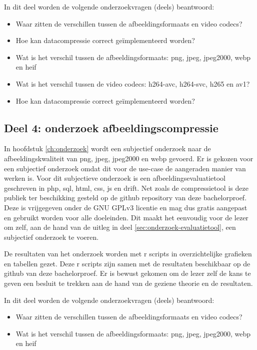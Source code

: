 In dit deel worden de volgende onderzoekvragen (deels) beantwoord: 
\begin{itemize}
	\item Waar zitten de verschillen tussen de \glspl{afbeeldingsformaat} en video \glspl{codec}?
	\item Hoe kan \gls{datacompressie} correct geïmplementeerd worden?
	\item Wat is het verschil tussen de \glspl{afbeeldingsformaat}: \gls{png}, \gls{jpeg}, \gls{jpeg2000}, \gls{webp} en \gls{heif}
	\item Wat is het verschil tussen de video \glspl{codec}: \gls{h264-avc}, \gls{h264-svc}, \gls{h265} en \gls{av1}?
	\item Hoe kan \gls{datacompressie} correct geïmplementeerd worden?
\end{itemize}

\subsection{Deel 4: onderzoek afbeeldingscompressie}
\label{sec:aanpak-bachelorproef-deel-4}

In hoofdstuk \ref{ch:onderzoek} wordt een subjectief onderzoek naar de afbeeldingskwaliteit van \gls{png}, \gls{jpeg}, \gls{jpeg2000} en \gls{webp} gevoerd. Er is gekozen voor een subjectief onderzoek omdat dit voor de \gls{use-case} de aangeraden manier van werken is. Voor dit subjectieve onderzoek is een \gls{afbeeldingsevaluatietool} geschreven in \gls{php}, \gls{sql}, \gls{html}, \gls{css}, \gls{js} en \gls{drift}. Net zoals de \gls{compressietool} is deze publiek ter beschikking gesteld op de \gls{github} repository van deze bachelorproef. Deze is vrijgegeven onder de GNU GPLv3 licentie en mag dus gratis aangepast en gebruikt worden voor alle doeleinden. Dit maakt het eenvoudig voor de lezer om zelf, aan de hand van de uitleg in deel \ref{sec:onderzoek-evaluatietool}, een subjectief onderzoek te voeren.

De resultaten van het onderzoek worden met \gls{r} scripts in overzichtelijke grafieken en tabellen gezet. Deze \gls{r} scripts zijn samen met de resultaten beschikbaar op de \gls{github} van deze bachelorproef. Er is bewust gekomen om de lezer zelf de kans te geven een besluit te trekken aan de hand van de geziene theorie en de resultaten.


In dit deel worden de volgende onderzoekvragen (deels) beantwoord: 
\begin{itemize}
	\item Waar zitten de verschillen tussen de \glspl{afbeeldingsformaat} en video \glspl{codec}?
	\item Wat is het verschil tussen de \glspl{afbeeldingsformaat}: \gls{png}, \gls{jpeg}, \gls{jpeg2000}, \gls{webp} en \gls{heif}
\end{itemize}

